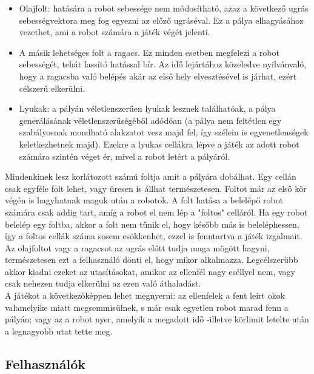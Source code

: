 \begin{itemize}
	\item Olajfolt: hatására a robot sebessége nem módosítható, azaz a következő ugrás sebességvektora meg fog egyezni az előző ugráséval. Ez a pálya elhagyásához vezethet, ami a robot számára a játék végét jelenti.
	
	\item A másik lehetséges folt a ragacs. Ez minden esetben megfelezi a robot sebességét, tehát lassító hatással bír. Az idő lejártához közeledve nyilvánvaló, hogy a ragacsba való belépés akár az első hely elvesztésével is járhat, ezért célszerű elkerülni.
	
	\item Lyukak: a pályán véletlenszerűen lyukak lesznek találhatóak, a pálya generálásának véletlenszerűségéből adódóan (a pálya nem feltétlen egy szabályosnak mondható alakzatot vesz majd fel, így szélein is egyenetlenségek keletkezhetnek majd). Ezekre a lyukas cellákra lépve a játék az adott robot számára szintén véget ér, mivel a robot letért a pályáról.
\end{itemize}

Mindenkinek lesz korlátozott számú foltja amit a pályára dobálhat. Egy cellán csak egyféle folt lehet, vagy üresen is állhat természetesen. Foltot már az első kör végén is hagyhatnak maguk után a robotok. A folt hatása a belelépő robot számára csak addig tart, amíg a robot el nem lép a "foltos" celláról. Ha egy robot belelép egy foltba, akkor a folt nem tűnik el, hogy később más is beleléphessen, így a foltos cellák száma sosem csökkenhet, ezzel is fenntartva a játék izgalmait.\\

Az olajfoltot vagy a ragacsot az ugrás előtt tudja maga mögött hagyni, természetesen ezt a felhasználó dönti el, hogy mikor alkalmazza. Legcélszerűbb akkor kiadni ezeket az utasításokat, amikor az ellenfél nagy eséllyel nem, vagy csak nehezen tudja elkerülni az ezen való áthaladást.\\

A játékot a következőképpen lehet megnyerni: az ellenfelek a fent leírt okok valamelyike miatt megsemmisülnek, s már csak egyetlen robot marad fenn a pályán; vagy az a robot nyer, amelyik a megadott idő -illetve körlimit letelte után a legnagyobb utat tette meg.\\

\subsection{Felhasználók}

